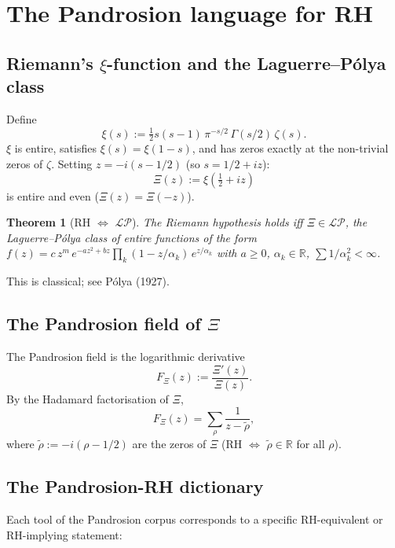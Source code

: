 \documentclass[11pt,a4paper]{article}
\newtheorem{theorem}{Theorem}[section]
\begin{document}
\tableofcontents

\section{The Pandrosion language for RH}\label{sec:dictionary}

\subsection{Riemann's $\xi$-function and the Laguerre--P\'olya class}

Define
\[
\xi(s) := \tfrac{1}{2} s(s-1)\, \pi^{-s/2}\, \Gamma(s/2)\, \zeta(s).
\]
$\xi$ is entire, satisfies $\xi(s) = \xi(1-s)$, and has zeros exactly at the
non-trivial zeros of $\zeta$. Setting $z = -i(s - 1/2)$ (so $s = 1/2 + iz$):
\[
\Xi(z) := \xi(\tfrac{1}{2} + iz)
\]
is entire and even ($\Xi(z) = \Xi(-z)$).

\begin{theorem}[RH $\Leftrightarrow$ $\mathcal{LP}$]\label{thm:RH-LP}
The Riemann hypothesis holds iff $\Xi \in \mathcal{LP}$, the Laguerre--P\'olya
class of entire functions of the form
$f(z) = c\, z^m\, e^{-az^2 + bz} \prod_k (1 - z/\alpha_k)\, e^{z/\alpha_k}$ with
$a \ge 0$, $\alpha_k \in \mathbb{R}$, $\sum 1/\alpha_k^2 < \infty$.
\end{theorem}

This is classical; see P\'olya (1927).

\subsection{The Pandrosion field of $\Xi$}

The Pandrosion field is the logarithmic derivative
\[
F_\Xi(z) := \frac{\Xi'(z)}{\Xi(z)}.
\]
By the Hadamard factorisation of $\Xi$,
\[
F_\Xi(z) = \sum_\rho \frac{1}{z - \tilde\rho},
\]
where $\tilde\rho := -i(\rho - 1/2)$ are the zeros of $\Xi$ (RH $\Leftrightarrow$
$\tilde\rho \in \mathbb{R}$ for all $\rho$).

\subsection{The Pandrosion-RH dictionary}

Each tool of the Pandrosion corpus corresponds to a specific RH-equivalent
or RH-implying statement:
\end{document}
